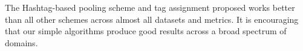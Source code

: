 \documentclass[10pt,a5paper,twoside]{article}
\begin{document}
The Hashtag-based pooling scheme and tag assignment proposed works better than all other schemes across almost all datasets and metrics. It is encouraging that our simple algorithms produce good results across a broad spectrum of domains.

%


%
%




%
%




%

\end{document}

